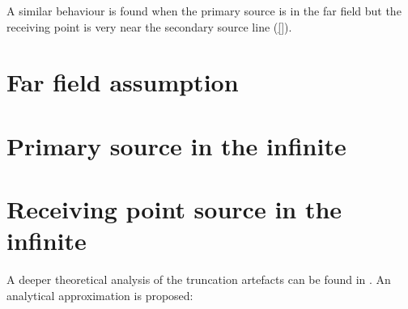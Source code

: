 A similar behaviour is found when the primary source is in the far field but the receiving point is very near the secondary source line (\autoref{}).




\section{Far field assumption}


\section{Primary source in the infinite}

\section{Receiving point source in the infinite}



A deeper theoretical analysis of the truncation artefacts can be found in \cite[Section 4.3]{Start1997}. An analytical approximation is proposed:


